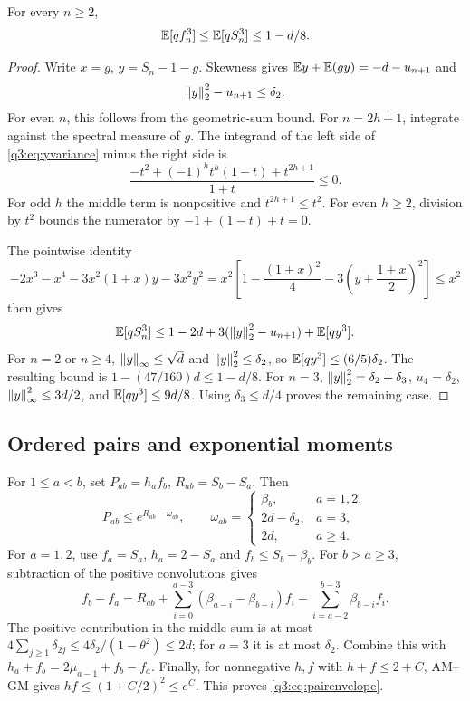 \begin{lemma}\label{q3:lem:weightedpathcube}
For every $n\ge2$,
\[
 \mathbb E[qf_n^3]\le\mathbb E[qS_n^3]\le1-d/8.
\]
\end{lemma}
\begin{proof}
Write $x=g$, $y=S_n-1-g$. Skewness gives $\mathbb E y+\mathbb E(gy)=-d-u_{n+1}$ and
\begin{equation}\label{q3:eq:yvariance}
 \left\lVert y\right\rVert_2^2-u_{n+1}\le \delta_{2}.
\end{equation}
For even $n$, this follows from the geometric-sum bound. For $n=2h+1$, integrate against the spectral measure of $g$. The integrand of the left side of \eqref{q3:eq:yvariance} minus the right side is
\[
 \frac{-t^2+(-1)^ht^h(1-t)+t^{2h+1}}{1+t}\le0.
\]
For odd $h$ the middle term is nonpositive and $t^{2h+1}\le t^2$. For even $h\ge2$, division by $t^2$ bounds the numerator by $-1+(1-t)+t=0$.

The pointwise identity
\[
 -2x^3-x^4-3x^2(1+x)y-3x^2y^2
 =x^2\left[1-\frac{(1+x)^2}{4}-3\left(y+\frac{1+x}{2}\right)^2\right]\le x^2
\]
then gives
\[
 \mathbb E[qS_n^3]\le1-2d+3(\left\lVert y\right\rVert_2^2-u_{n+1})+\mathbb E[qy^3].
\]
For $n=2$ or $n\ge4$, $\left\lVert y\right\rVert_\infty\le\sqrt d$ and $\left\lVert y\right\rVert_2^2\le \delta_{2}$, so $\mathbb E[qy^3]\le(6/5)\delta_{2}$. The resulting bound is $1-(47/160)d\le1-d/8$. For $n=3$, $\left\lVert y\right\rVert_2^2=\delta_{2}+\delta_{3}$, $u_4=\delta_{2}$, $\left\lVert y\right\rVert_\infty^2\le3d/2$, and $\mathbb E[qy^3]\le9d/8$. Using $\delta_{3}\le d/4$ proves the remaining case.
\end{proof}

\subsection{Ordered pairs and exponential moments}
For $1\le a<b$, set $P_{ab}=h_af_b$, $R_{ab}=S_b-S_a$. Then
\begin{equation}\label{q3:eq:pairenvelope}
 P_{ab}\le e^{R_{ab}-\omega_{ab}},\qquad
 \omega_{ab}=
 \begin{cases}
 \beta_b,&a=1,2,\\
 2d-\delta_{2},&a=3,\\
 2d,&a\ge4.
 \end{cases}
\end{equation}
For $a=1,2$, use $f_a=S_a$, $h_a=2-S_a$ and $f_b\le S_b-\beta_b$. For $b>a\ge3$, subtraction of the positive convolutions gives
\[
 f_b-f_a=R_{ab}+\sum_{i=0}^{a-3}(\beta_{a-i}-\beta_{b-i})f_i
                 -\sum_{i=a-2}^{b-3}\beta_{b-i}f_i.
\]
The positive contribution in the middle sum is at most
$4\sum_{j\ge1}\delta_{2j}\le4\delta_{2}/(1-\theta^2)\le2d$; for $a=3$ it is at most $\delta_{2}$. Combine this with $h_a+f_b=2\mu_{a-1}+f_b-f_a$. Finally, for nonnegative $h,f$ with $h+f\le2+C$, AM--GM gives $hf\le(1+C/2)^2\le e^C$. This proves \eqref{q3:eq:pairenvelope}.

